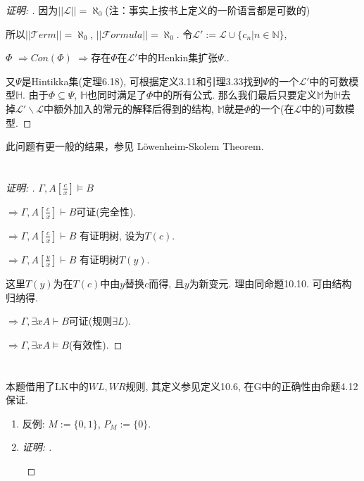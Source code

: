 \documentclass{article}
\begin{document}
\begin{CJK*}{UTF8}{gbsn}
\begin{proof}[\emph{证明: }]
因为$||\mathscr{L}|| = \aleph_0$(注：事实上按书上定义的一阶语言都是可数的)

所以$||\mathcal{T}erm|| = \aleph_0$, $||\mathcal{F}ormula|| = \aleph_0$. 
令$\mathscr{L'} := \mathscr{L} \cup \{c_n | n \in \mathbb{N}\}$,

$\Phi$
$\Rightarrow Con(\Phi)$
$\Rightarrow \text{存在}\Phi\text{在}\mathscr{L'}\text{中的Henkin集扩张}\Psi. $. 

又$\Psi$是Hintikka集(定理6.18), 可根据定义3.11和引理3.33找到$\Psi$的一个$\mathscr{L'}$中的可数模型$\mathbb{H}$. 由于$\Phi \subseteq \Psi$, $\mathbb{H}$也同时满足了$\Phi$中的所有公式. 那么我们最后只要定义$\mathbb{M}$为$\mathbb{H}$去掉$\mathscr{L'} \backslash \mathscr{L}$中额外加入的常元的解释后得到的结构, $\mathbb{M}$就是$\Phi$的一个(在$\mathscr{L}$中的)可数模型. 
\end{proof}

此问题有更一般的结果，参见 L\"owenheim-Skolem Theorem. 
\section{}
\begin{proof}[\emph{证明: }]

$\Gamma , A[\frac{c}{x}] \models B$

 $\Rightarrow \Gamma , A[\frac{c}{x}] \vdash B$可证(完全性). 

$\Rightarrow \Gamma , A[\frac{c}{x}] \vdash B$ 有证明树, 设为$T(c)$. 

$\Rightarrow \Gamma , A[\frac{y}{x}] \vdash B$ 有证明树$T(y)$. 

这里$T(y)$为在$T(c)$中由$y$替换$c$而得, 且$y$为新变元. 理由同命题10.10. 可由结构归纳得. 

$\Rightarrow\Gamma , \exists xA\vdash B$可证(规则$\exists L$). 

$\Rightarrow \Gamma  , \exists xA\models B$(有效性). 
\end{proof}
\section{}
本题借用了LK中的$WL,WR$规则, 其定义参见定义10.6, 在G中的正确性由命题4.12保证. 
\begin{enumerate}[(1)]
\item 反例: $M:=\{0,1\}$, $P_M:=\{0\}$. 
\item 
		
\begin{proof}[\emph{证明: }] ~
\begin{prooftree}


\end{prooftree}
\end{proof}
\end{enumerate}
\end{CJK*}
\end{document}
